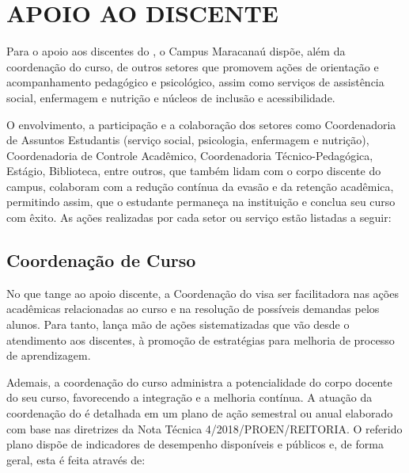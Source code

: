 \documentclass{paper}
\begin{document}

\clearpage
\section{APOIO AO DISCENTE}\label{APOIO}

Para o apoio aos discentes do \NOMECURSO, o Campus Maracanaú dispõe, além da coordenação do curso, de outros setores que promovem ações de orientação e acompanhamento pedagógico e psicológico, assim como serviços de assistência social, enfermagem e nutrição e núcleos de inclusão e acessibilidade.
 
O envolvimento, a participação e a colaboração dos setores como Coordenadoria de Assuntos Estudantis (serviço social, psicologia, enfermagem e nutrição), Coordenadoria de Controle Acadêmico, Coordenadoria Técnico-Pedagógica, Estágio, Biblioteca, entre outros, que também lidam com o corpo discente do campus, colaboram com a redução contínua da evasão e da retenção acadêmica, permitindo assim, que o estudante permaneça na instituição e conclua seu curso com êxito. As ações realizadas por cada setor ou serviço estão listadas a seguir:

\subsection{Coordenação de Curso}
No que tange ao apoio discente, a Coordenação do \NOMECURSO visa ser facilitadora nas ações acadêmicas relacionadas ao curso e na resolução de possíveis demandas pelos alunos. Para tanto, lança mão de ações sistematizadas que vão desde o atendimento aos discentes, à promoção de estratégias para melhoria de processo de aprendizagem. 

Ademais, a coordenação do curso administra a potencialidade do corpo docente do seu curso, favorecendo a integração e a melhoria contínua. A atuação da coordenação do \NOMECURSO é detalhada em um plano de ação semestral ou anual elaborado com base nas diretrizes da Nota Técnica 4/2018/PROEN/REITORIA. O referido plano dispõe de indicadores de desempenho disponíveis e públicos e, de forma geral, esta é feita através de:
\end{document}
